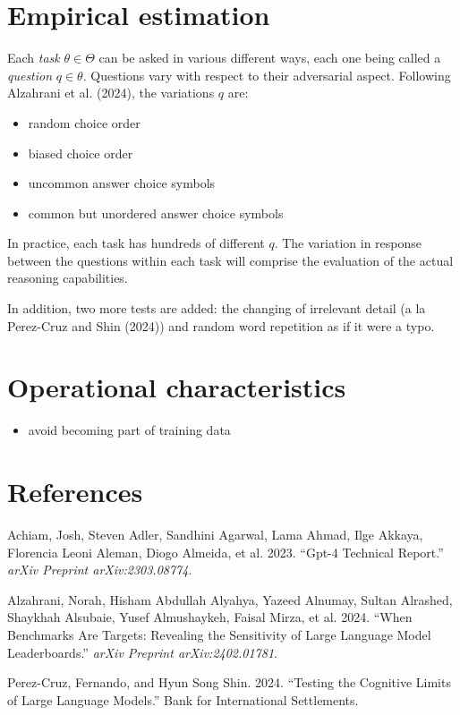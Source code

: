 \documentclass[
]{article}
\providecommand{\tightlist}{%
  \setlength{\itemsep}{0pt}\setlength{\parskip}{0pt}}\usepackage{longtable,booktabs,array}
\newlength{\cslhangindent}
\newenvironment{CSLReferences}[2] %
 {\begin{list}{}{%
  \setlength{\itemindent}{0pt}
  \setlength{\leftmargin}{0pt}
  \setlength{\parsep}{0pt}
  \ifodd #1
   \setlength{\leftmargin}{\cslhangindent}
   \setlength{\itemindent}{-1\cslhangindent}
  \fi
  \setlength{\itemsep}{#2\baselineskip}}}
 {\end{list}}
\begin{document}
\section{Empirical estimation}\label{empirical-estimation}

Each \emph{task} \(\theta \in \Theta\) can be asked in various different
ways, each one being called a \emph{question} \(q \in \theta\).
Questions vary with respect to their adversarial aspect. Following
Alzahrani et al. (2024), the variations \(q\) are:

\begin{itemize}
\item
  random choice order
\item
  biased choice order
\item
  uncommon answer choice symbols
\item
  common but unordered answer choice symbols
\end{itemize}

In practice, each task has hundreds of different \(q\). The variation in
response between the questions within each task will comprise the
evaluation of the actual reasoning capabilities.

In addition, two more tests are added: the changing of irrelevant detail
(a la Perez-Cruz and Shin (2024)) and random word repetition as if it
were a typo.

\section{Operational characteristics}\label{operational-characteristics}

\begin{itemize}
\tightlist
\item
  avoid becoming part of training data
\end{itemize}

\section*{References}\label{references}

\label{refs}
\begin{CSLReferences}{1}{0}
Achiam, Josh, Steven Adler, Sandhini Agarwal, Lama Ahmad, Ilge Akkaya,
Florencia Leoni Aleman, Diogo Almeida, et al. 2023. {``Gpt-4 Technical
Report.''} \emph{arXiv Preprint arXiv:2303.08774}.

Alzahrani, Norah, Hisham Abdullah Alyahya, Yazeed Alnumay, Sultan
Alrashed, Shaykhah Alsubaie, Yusef Almushaykeh, Faisal Mirza, et al.
2024. {``When Benchmarks Are Targets: Revealing the Sensitivity of Large
Language Model Leaderboards.''} \emph{arXiv Preprint arXiv:2402.01781}.

Perez-Cruz, Fernando, and Hyun Song Shin. 2024. {``Testing the Cognitive
Limits of Large Language Models.''} Bank for International Settlements.

\end{CSLReferences}
\end{document}
